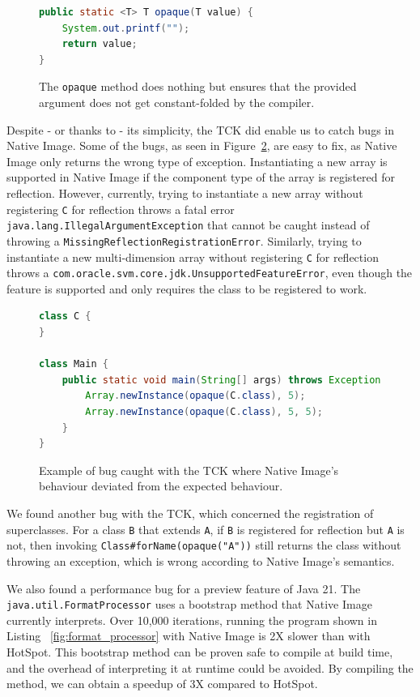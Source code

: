 \begin{figure}[ht]
    \centering
\begin{lstlisting}[language=Java]
public static <T> T opaque(T value) {
    System.out.printf("");
    return value;
}
\end{lstlisting}
    \caption{The \texttt{opaque} method does nothing but ensures that the provided argument does not get constant-folded by the compiler.}
    \label{fig:opaque}
\end{figure}

Despite - or thanks to - its simplicity, the TCK did enable us to catch bugs in Native Image. Some of the bugs, as seen in Figure~\ref{fig:new_multi_array_bug}, are easy to fix, as Native Image only returns the wrong type of exception.  
Instantiating a new array is supported in Native Image if the component type of the array is registered for reflection. However, currently, trying to instantiate a new array without registering \texttt{C} for reflection throws a fatal error \texttt{java.lang.IllegalArgumentException} that cannot be caught instead of throwing a \verb|MissingReflectionRegistrationError|. Similarly, trying to instantiate a new multi-dimension array without registering \texttt{C} for reflection throws a \texttt{com.oracle.svm.core.jdk.UnsupportedFeatureError}, even though the feature is supported and only requires the class to be registered to work.

\begin{figure}[ht]
    \centering
\begin{lstlisting}[language=Java]
class C {
}

class Main {
    public static void main(String[] args) throws Exception {
        Array.newInstance(opaque(C.class), 5);
        Array.newInstance(opaque(C.class), 5, 5);
    }
}
\end{lstlisting}
    \caption{Example of bug caught with the TCK where Native Image's behaviour deviated from the expected behaviour.}
    \label{fig:new_multi_array_bug}
\end{figure}

We found another bug with the TCK, which concerned the registration of superclasses. For a class \verb|B| that extends \verb|A|, if \verb|B| is registered for reflection but \verb|A| is not, then invoking \verb|Class#forName(opaque("A"))| still returns the class without throwing an exception, which is wrong according to Native Image's semantics. 

We also found a performance bug for a preview feature of Java 21. The \verb|java.util.FormatProcessor| uses a bootstrap method that Native Image currently interprets. Over 10,000 iterations, running the program shown in Listing ~\ref{fig:format_processor} with Native Image is 2X slower than with HotSpot. This bootstrap method can be proven safe to compile at build time, and the overhead of interpreting it at runtime could be avoided. By compiling the method, we can obtain a speedup of 3X compared to HotSpot.

